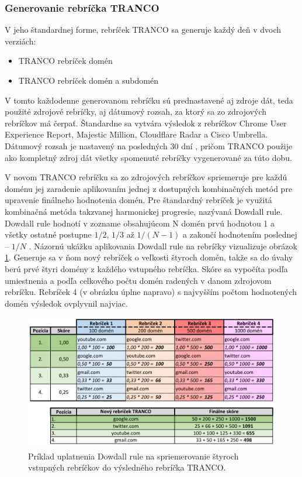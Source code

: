 \subsubsection{Generovanie rebríčka TRANCO}
\label{tranco-generation}

V jeho štandardnej forme, rebríček TRANCO sa generuje každý deň v dvoch verziách:
\begin{itemize}
    \item TRANCO rebríček domén
    \item TRANCO rebríček domén a subdomén
\end{itemize}

V tomto každodenne generovanom rebríčku sú prednastavené aj zdroje dát, teda použité zdrojové rebríčky, aj dátumový rozsah, za ktorý sa zo zdrojových rebríčkov má čerpať.
Štandardne sa vytvára výsledok z rebríčkov Chrome User Experience Report, Majestic Million, Cloudflare Radar a Cisco Umbrella.
Dátumový rozsah je nastavený na posledných 30 dní \cite{tranco-config}, pričom TRANCO použije ako kompletný zdroj dát všetky spomenuté rebríčky vygenerované za túto dobu. 

V novom TRANCO rebríčku sa zo zdrojových rebríčkov spriemeruje pre každú doménu jej zaradenie aplikovaním jednej z dostupných kombinačných metód pre upravenie finálneho hodnotenia domén.
Pre štandardný rebríček je využitá kombinačná metóda takzvanej harmonickej progresie, nazývaná Dowdall rule. 
Dowdall rule hodnotí v zozname obsahujúcom N domén prvú hodnotou 1 a všetky ostatné postupne \(1/2\), \(1/3\) až \(1/(N-1)\) a zakončí hodnotením poslednej -- \(1/N\) \cite{tranco, tranco-config}.
Názornú ukážku aplikovania Dowdall rule na rebríčky vizualizuje obrázok \ref{img:dowdall-rule}.
Generuje sa v ňom nový rebríček o veľkosti štyroch domén, takže sa do úvahy berú prvé štyri domény z každého vstupného rebríčka. 
Skóre sa vypočíta podľa umiestnenia a podľa celkového počtu domén radených v danom zdrojovom rebríčku. 
Rebríček 4 (v obrázku úplne napravo) s najvyšším počtom hodnotených domén výsledok ovplyvnil najviac.

\begin{figure}[htb]
\begin{center}
 \includegraphics[scale=0.84]{obrazky-figures/dowdall_rule_size_fit_cropped.pdf}
 \caption{Príklad uplatnenia Dowdall rule na spriemerovanie štyroch vstupných rebríčkov do výsledného rebríčka TRANCO.}
 \label{img:dowdall-rule}
\end{center}
\end{figure}

